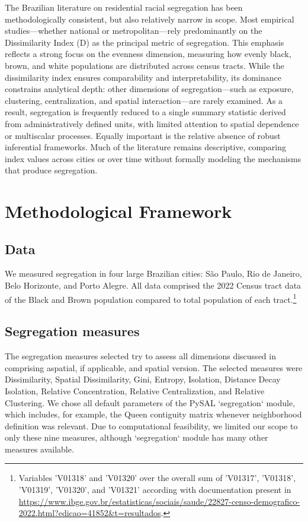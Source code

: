 \documentclass[12pt,a4paper]{article}
\begin{document}
The Brazilian literature on residential racial segregation has been methodologically consistent, but also relatively narrow in scope. Most empirical studies—whether national or metropolitan—rely predominantly on the Dissimilarity Index (D) as the principal metric of segregation. This emphasis reflects a strong focus on the evenness dimension, measuring how evenly black, brown, and white populations are distributed across census tracts. While the dissimilarity index ensures comparability and interpretability, its dominance constrains analytical depth: other dimensions of segregation—such as exposure, clustering, centralization, and spatial interaction—are rarely examined. As a result, segregation is frequently reduced to a single summary statistic derived from administratively defined units, with limited attention to spatial dependence or multiscalar processes. Equally important is the relative absence of robust inferential frameworks. Much of the literature remains descriptive, comparing index values across cities or over time without formally modeling the mechanisms that produce segregation.



\section{Methodological Framework}\label{sec:met-frame}


\subsection{Data}\label{subsec:data}

We measured segregation in four large Brazilian cities: São Paulo, Rio de Janeiro, Belo Horizonte, and Porto Alegre. All data comprised the 2022 Census tract data of the Black and Brown population compared to total population of each tract.\footnote{Variables 'V01318' and 'V01320' over the overall sum of 'V01317', 'V01318', 'V01319', 'V01320', and 'V01321' according with documentation present in \url{https://www.ibge.gov.br/estatisticas/sociais/saude/22827-censo-demografico-2022.html?edicao=41852&t=resultados}.}


\subsection{Segregation measures}\label{subsec:seg-mes}


The segregation measures selected try to assess all dimensions discussed in \cite{massey1988dimensions} comprising aspatial, if applicable, and spatial version. The selected measures were Dissimilarity, Spatial Dissimilarity, Gini, Entropy, Isolation, Distance Decay Isolation, Relative Concentration, Relative Centralization, and Relative Clustering. We chose all default parameters of the PySAL `segregation` module, which includes, for example, the Queen contiguity matrix whenever neighborhood definition was relevant. Due to computational feasibility, we limited our scope to only these nine measures, although `segregation` module has many other measures available.
\end{document}
